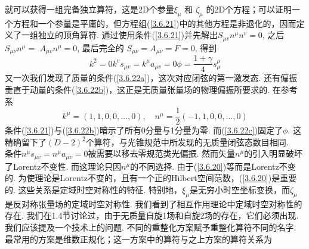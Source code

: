 就可以获得一组完备独立算符，这是2D个参量$\xi_{\mu}$ 和 $\zeta_{\mu}$ 的2D个方程；可以证明一个方程和一个参量是平庸的，但方程组(\ref{3.6.21})中的其他方程是非退化的，因而定义了一组独立的顶角算符.
通过使用条件(\ref{3.6.21})并先解出$S_{\mu v} n^{\mu} n^{v}=0$, 之后 $S_{\mu \nu} n^{\mu}=$ $A_{\mu v} n^{\mu}=0$, 最后完全的 $S_{\mu \nu}=A_{\mu \nu}=F=0$, 得到
\begin{subequations}
\begin{equation}\label{3.6.22a}
k^{2}=0
\end{equation}
\begin{equation}\label{3.6.22b}
k^{v} s_{\mu v}=k^{\mu} a_{\mu v}=0
\end{equation}
\begin{equation}\label{3.6.22c}
\phi=\frac{1+\gamma}{4} s_{\mu}^{\mu}
\end{equation}
\end{subequations}
又一次我们发现了质量的条件(\ref{3.6.22a})，这次对应闭弦的第一激发态. 还有偏振垂直于动量的条件(\ref{3.6.22b})，这正是无质量张量场的物理偏振所要求的. 在参考系
\begin{equation}
k^{\mu}=(1,1,0,0, \ldots, 0), \quad n^{\mu}=\frac{1}{2}(-1,1,0,0, \ldots, 0)
\end{equation}
条件(\ref{3.6.21})与(\ref{3.6.22b})暗示了所有0分量与1分量为零. 而(\ref{3.6.22c})固定了$\phi$. 这精确留下了$(D-2)^2$个算符，与光锥规范中所发现的无质量闭弦态数目相同.\\
条件$n^{\mu} s_{\mu v}=n^{\mu} a_{\mu v}=0$被需要以移去零规范类光偏振. 然而矢量$n^\mu$的引入明显破坏了Lorentz不变性. 而这理论只因$n^\mu$的不同选择. 由于(\ref{3.6.20})等而是Lorentz不变的. 为使理论是Lorentz不变的，且有一个正的Hilbert空间范数，(\ref{3.6.20})是重要的. 这些关系是定域时空对称性的特征. 特别地，$\xi_{\mu}$是无穷小时空坐标变换，而$\zeta_{\mu}$是反对称张量场的定域时空对称性. 我们看到了相互作用理论中定域时空对称性的存在. 我们在1.4节讨论过，由于无质量自旋1场和自旋2场的存在，它们必须出现.\\
我们应该提及一个技术上的问题. 不同的重整化方案赋予重整化算符不同的名字. 最常用的方案是维数正规化；这一方案中的算符与之上方案的算符关系为
